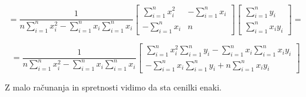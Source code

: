 \documentclass{article}
\begin{document}
\begin{equation*}
=
\frac{1}{n\sum_{i=1}^nx_i^2-\sum_{i=1}^nx_i\sum_{i=1}^nx_i}
\begin{bmatrix}
\sum_{i=1}^nx_i^2 & -\sum_{i=1}^nx_i\\
-\sum_{i=1}^nx_i & n
\end{bmatrix}
\begin{bmatrix}
\sum_{i=1}^ny_i\\
\sum_{i=1}^nx_iy_i
\end{bmatrix}
=
\end{equation*}

\begin{equation*}
=
\frac{1}{n\sum_{i=1}^nx_i^2-\sum_{i=1}^nx_i\sum_{i=1}^nx_i}
\begin{bmatrix}
\sum_{i=1}^nx_i^2\sum_{i=1}^ny_i - \sum_{i=1}^nx_i\sum_{i=1}^nx_iy_i\\
-\sum_{i=1}^nx_i\sum_{i=1}^ny_i+n\sum_{i=1}^nx_iy_i
\end{bmatrix}
\end{equation*}

Z malo računanja in spretnosti vidimo da sta cenilki enaki.
\end{document}
